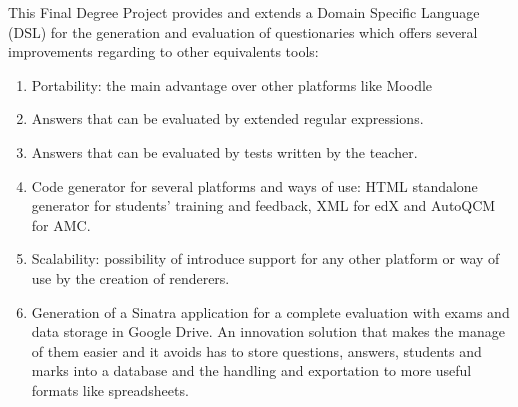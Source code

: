 
This Final Degree Project provides and extends a Domain Specific Language (DSL) for the generation and evaluation of questionaries which offers several improvements regarding to other equivalents 
tools:
\begin{enumerate}
  \item Portability: the main advantage over other platforms like Moodle\cite{moodle}
  \item Answers that can be evaluated by extended regular expressions.
  \item Answers that can be evaluated by tests written by the teacher.
  \item Code generator for several platforms and ways of use: HTML standalone generator for students' training and feedback, XML for edX\cite{edx} and AutoQCM for AMC\cite{amc}.
  \item Scalability: possibility of introduce support for any other platform or way of use by the creation of renderers.
  \item Generation of a Sinatra application for a complete evaluation with exams and data storage in Google Drive. An innovation solution that makes the manage of them easier and it avoids has to 
store questions, answers, students and marks into a database and the handling and exportation to more useful formats like spreadsheets. 
\end{enumerate}

